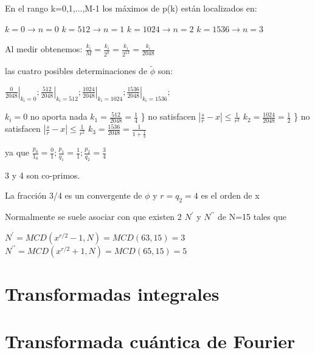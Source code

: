 \documentclass[11pt, spanish]{report}
\begin{document}
En el rango k=0,1,...,M-1 los máximos de p(k) están localizados en:

$k=0 \rightarrow n=0$
$k=512 \rightarrow n=1$
$k=1024 \rightarrow n=2$
$k=1536 \rightarrow n=3$


Al medir obtenemos: $\frac{k_i}{M} = \frac{k_i}{2^k} = \frac{k_i}{2^{13}} = \frac{k_i}{2048}$

las cuatro posibles determinaciones de $\tilde{\phi}$ son:

$\left. \frac{0}{2048} \right|_{k_i=0}; \left. \frac{512}{2048} \right|_{k_i=512}; \left. \frac{1024}{2048} \right|_{k_i=1024}; \left. \frac{1536}{2048} \right|_{k_i=1536};$

$k_i = 0$ no aporta nada
$k_1 = \frac{512}{2048} = \frac{1}{4}$ \} no satisfacen $|\frac{s}{r} - x| \leq \frac{1}{r^2}$
$k_2 = \frac{1024}{2048} = \frac{1}{2}$ \} no satisfacen $|\frac{s}{r} - x| \leq \frac{1}{r^2}$
$k_3 = \frac{1536}{2048} = \frac{1}{1+\frac{1}{3}}$

ya que $\frac{p_0}{1_0} = \frac{0}{1}; \frac{p_1}{q_1} = \frac{1}{1}; \frac{p_2}{q_2} = \frac{3}{4}$

3 y 4 son co-primos.

La fracción 3/4 es un convergente de $\phi$ y $r = q_2 = 4$ es el orden de x

Normalmente se suele asociar con que existen 2 $N^\prime$ y $N^{\prime\prime}$ de N=15 tales que

$N^\prime = MCD(x^{r/2} - 1, N) = MCD(63, 15) = 3$
$N^{\prime\prime} = MCD(x^{r/2} + 1, N) = MCD(65, 15) = 5$























\section{Transformadas integrales}

\section{Transformada cuántica de Fourier}
\end{document}
